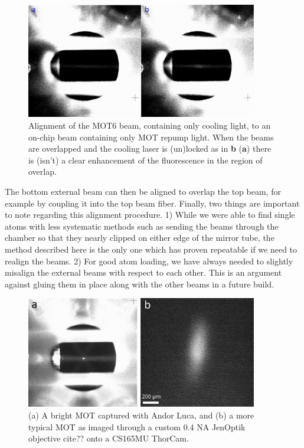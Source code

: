\begin{figure}[!ht]
    \centering
    \includegraphics[width=0.9\textwidth]{Images/mot6_alignment_to_repump.pdf}
    \caption{Alignment of the MOT6 beam, containing only cooling 
    light, to an on-chip beam containing only MOT repump light. When the 
    beams are overlapped and the cooling laser is (un)locked as in \textbf{b} (\textbf{a}) there is (isn't) a clear enhancement of the 
    fluorescence in the region of overlap.}
    \label{fig:external_beam_alignment}
\end{figure}
The bottom external beam can then be aligned to overlap the top beam, for example by coupling it into the top beam fiber. Finally, two things are important to note regarding this alignment procedure. 1) While we were able to find single atoms with less systematic methods such as sending the beams through the chamber so that they nearly clipped on either edge of the mirror tube, the method described here is the only one which has proven repeatable if we need to realign the beams. 2) For good atom loading, we have always needed to slightly misalign the external beams with respect to each other. This is an argument against gluing them in place along with the other beams in a future build.
\begin{figure}[!ht]
    \centering
    \includegraphics[width=0.9\textwidth]{Images/large_mot_and_thorcam_mot.pdf}
    \caption{(a) A bright MOT captured with Andor Luca, and (b) a more typical MOT 
    as imaged through a custom 0.4 NA JenOptik objective cite?? onto a 
    CS165MU ThorCam.}
    \label{fig:large_mot_and_thorcam_mot}
\end{figure}
